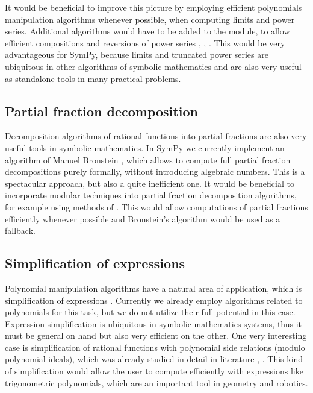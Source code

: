 It would be beneficial to improve this picture by employing efficient polynomials manipulation algorithms
whenever possible, when computing limits and power series. Additional algorithms would have to be added
to the module, to allow efficient compositions and reversions of power series \cite{Zippel1976expansions},
\cite{Brent1975series}, \cite{Brent1978fps}. This would be very advantageous for SymPy, because limits and
truncated power series are ubiquitous in other algorithms of symbolic mathematics and are also very
useful as standalone tools in many practical problems.


\subsection{Partial fraction decomposition}

Decomposition algorithms of rational functions into partial fractions are also very useful tools
in symbolic mathematics. In SymPy we currently implement an algorithm of Manuel Bronstein
\cite{Bronstein1993partial}, which allows to compute full partial fraction decompositions purely
formally, without introducing algebraic numbers. This is a spectacular approach, but also a
quite inefficient one. It would be beneficial to incorporate modular techniques into partial
fraction decomposition algorithms, for example using methods of \cite{Wang1981partial}. This would
allow computations of partial fractions efficiently whenever possible and Bronstein's algorithm
would be used as a fallback.


\subsection{Simplification of expressions}

Polynomial manipulation algorithms have a natural area of application, which is simplification
of expressions \cite{Moses1971simplification}. Currently we already employ algorithms related to
polynomials for this task, but we do not utilize their full potential in this case. Expression
simplification is ubiquitous in symbolic mathematics systems, thus it must be general on hand but
also very efficient on the other. One very interesting case is simplification of rational functions
with polynomial side relations (modulo polynomial ideals), which was already studied in detail in
literature \cite{Pearce2001relations}, \cite{Monagan2006modulo}. This kind of simplification would allow
the user to compute efficiently with expressions like trigonometric polynomials, which are an
important tool in geometry and robotics.


